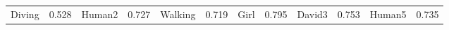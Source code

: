 \documentclass{article}
\begin{document}
\begin{table} [htbp]
{\begin{tabular}{cccccccccccc}
\textcolor[rgb]{0,1,0}{Diving}&0.528&Human2&0.727&Walking&0.719&Girl&0.795&David3&0.753&Human5&0.735\\

\end{tabular}}
\end{table}
\end{document}
